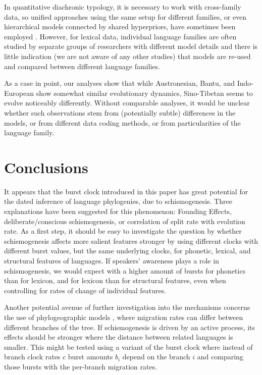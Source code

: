\documentclass[]{rsos}%
\begin{document}
In quantitative diachronic typology, it is necessary to work with cross-family
data, so unified approaches using the same setup for different families, or even
hierarchical models connected by shared hyperpriors, have sometimes been
employed \parencite{dunn2011evolved,jager2021phylogenetic}. However, for lexical
data, individual language families are often studied by separate groups of
researchers with different model details and there is little indication
(we are not aware of any other studies) that
models are re-used and compared between different language families.

As a case in point, our analyses show that while Austronesian, Bantu, and
Indo-European show somewhat similar evolutionary dynamics, Sino-Tibetan
seems to evolve noticeably differently. Without comparable analyses, it would be
unclear whether such observations stem from (potentially subtle)
differences in the models, or from different data coding
methods, or from particularities of the language family.

\section{Conclusions}\label{s:conclusions}

It appears that the burst clock introduced in this paper has great potential for the dated inference of language phylogenies, due to schismogenesis. 
Three explanations have been suggested for this phenomenon:
Founding Effects, deliberate/conscious schismogenesis, or correlation of split
rate with evolution rate. As a first step, it should be easy to investigate the
question by \textcite{gray2013three}
whether schismogenesis affects more salient features stronger
by using different clocks with different
burst values, but the same underlying clocks, for phonetic, lexical, and
structural features of languages.
If speakers' awareness plays a role in
schismogenesis, we would expect with \citeauthor{gray2013three} a
higher amount of bursts for phonetics than for lexicon, and for lexicon than for
structural features, even when controlling for rates of change of individual
features.

Another potential avenue of further investigation into the mechanisms
concerns the use of phylogeographic models \parencite{neureiter2021can}, where
migration rates can differ between different branches of the tree.
If schismogenesis is driven by an active process, its effects should be stronger
where the distance between related languages is smaller. This might be tested
using a variant of the burst clock where instead of branch clock rates $c$
burst amounts $b_i$ depend on the branch $i$ and comparing those bursts with the
per-branch migration rates.
\end{document}
